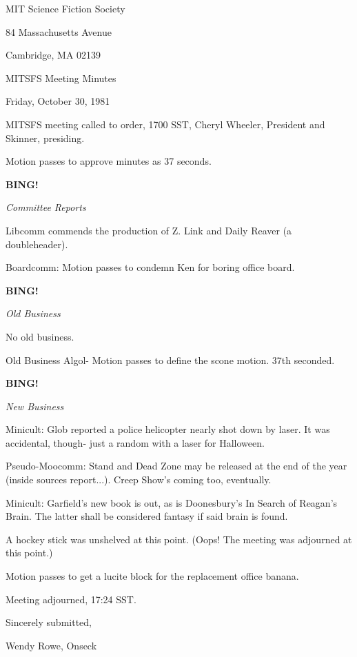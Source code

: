 \documentclass[12pt]{article}
\newcommand{\bing}{{\bf BING!} }
\newcommand{\goto}[1]{\bing \vskip 12pt \centerline{{\em{#1}}}}
\begin{document}
\begin{center}

MIT Science Fiction Society 

84 Massachusetts Avenue

Cambridge, MA 02139

\vspace{12pt}

MITSFS Meeting Minutes 

Friday, October 30, 1981

\end{center}
 
\vspace{18pt}

\setlength{\parskip}{6pt}

\noindent
MITSFS meeting called to order, 1700 SST,
Cheryl Wheeler, President and Skinner, presiding.

Motion passes to approve minutes as 37 seconds.

\goto{Committee Reports}

Libcomm commends the production of Z. Link and Daily Reaver (a doubleheader).

Boardcomm: Motion passes to condemn Ken for boring office board.

\goto{Old Business}

No old business.

Old Business Algol- Motion passes to define the scone motion. 37th seconded.

\goto{New Business}

Minicult: Glob reported a police helicopter nearly shot down by laser. It was accidental, though- just a random with a laser for Halloween.

Pseudo-Moocomm: Stand and Dead Zone may be released at the end of the year (inside sources report...). Creep Show's coming too, eventually.

Minicult: Garfield's new book is out, as is Doonesbury's In Search of Reagan's Brain. The latter shall be considered fantasy if said brain is found.

A hockey stick was unshelved at this point. (Oops! The meeting was adjourned at this point.)

Motion passes to get a lucite block for the replacement office banana.

\vspace{12pt}

\noindent
Meeting adjourned, 17:24 SST.

\vspace{18pt}

\centerline{Sincerely submitted,}
\centerline{Wendy Rowe, Onseck}
\end{document}
